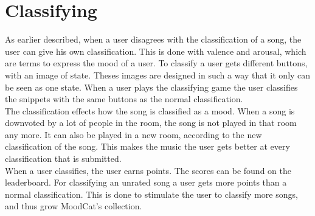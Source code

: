 \section{Classifying}
As earlier described, when a user disagrees with the classification of a song, the user can give his own classification.
This is done with valence and arousal, which are terms to express the mood of a user.
To classify a user gets different buttons, with an image of state. Theses images are designed in such a way that it only can be seen as one state.
When a user plays the classifying game the user classifies the snippets with the same buttons as the normal classification.\\
The classification effects how the song is classified as a mood. When a song is downvoted by a lot of people in the room, the song is not played in that room any more. It can also be played in a new room, according to the new classification of the song. This makes the music the user gets better at every classification that is submitted. \\
When a user classifies, the user earns points. The scores can be found on the leaderboard. 
For classifying an unrated song a user gets more points than a normal classification.   
This is done to stimulate the user to classify more songs, and thus grow MoodCat's collection.